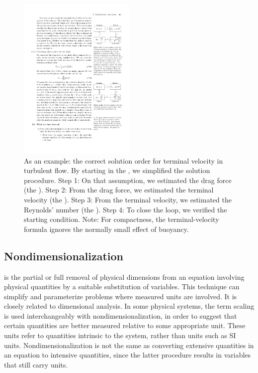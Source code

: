%
%
%
\begin{figure}[bt]\label{fig:solutionorder}
  \caption{As an example: the correct solution order for terminal velocity in turbulent flow. By starting in the , we simplified the solution procedure. Step 1: On that assumption, we estimated the drag force (the ). Step 2: From the drag force, we estimated the terminal velocity (the ). Step 3: From the terminal velocity, we estimated the Reynolds' number (the ). Step 4: To close the loop, we verified the starting condition. Note: For compactness, the terminal-velocity formula ignores the normally small effect of buoyancy.}
  \centering
    \includegraphics[width=0.5\textwidth]{./graphs/solution-order.pdf}
\end{figure}
%



\subsection{Nondimensionalization}
 is the partial or full removal of physical dimensions from an equation involving physical quantities by a suitable substitution of variables. This technique can simplify and parameterize problems where measured units are involved. It is closely related to dimensional analysis. In some physical systems, the term scaling is used interchangeably with nondimensionalization, in order to suggest that certain quantities are better measured relative to some appropriate unit. These units refer to quantities intrinsic to the system, rather than units such as SI units. Nondimensionalization is not the same as converting extensive quantities in an equation to intensive quantities, since the latter procedure results in variables that still carry units.

